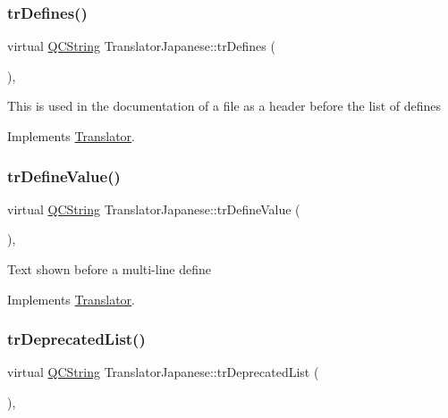 \subsubsection{\texorpdfstring{trDefines()}{trDefines()}}
{\footnotesize\ttfamily virtual \mbox{\hyperlink{class_q_c_string}{Q\+C\+String}} Translator\+Japanese\+::tr\+Defines (\begin{DoxyParamCaption}{ }\end{DoxyParamCaption})\hspace{0.3cm}{\ttfamily [inline]}, {\ttfamily [virtual]}}

This is used in the documentation of a file as a header before the list of defines 

Implements \mbox{\hyperlink{class_translator}{Translator}}.

\mbox{\label{class_translator_japanese_a5a68d01de2ed6ab1c5a37596bf7e395d}} 
\subsubsection{\texorpdfstring{trDefineValue()}{trDefineValue()}}
{\footnotesize\ttfamily virtual \mbox{\hyperlink{class_q_c_string}{Q\+C\+String}} Translator\+Japanese\+::tr\+Define\+Value (\begin{DoxyParamCaption}{ }\end{DoxyParamCaption})\hspace{0.3cm}{\ttfamily [inline]}, {\ttfamily [virtual]}}

Text shown before a multi-\/line define 

Implements \mbox{\hyperlink{class_translator}{Translator}}.

\mbox{\label{class_translator_japanese_af90f29d1e0a9ab6d2edf88a47705fece}} 
\subsubsection{\texorpdfstring{trDeprecatedList()}{trDeprecatedList()}}
{\footnotesize\ttfamily virtual \mbox{\hyperlink{class_q_c_string}{Q\+C\+String}} Translator\+Japanese\+::tr\+Deprecated\+List (\begin{DoxyParamCaption}{ }\end{DoxyParamCaption})\hspace{0.3cm}{\ttfamily [inline]}, {\ttfamily [virtual]}}

